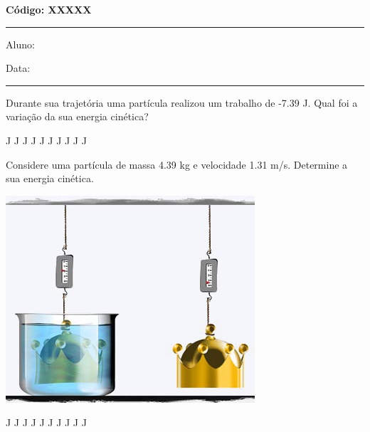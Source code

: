 \documentclass[12pt, addpoints]{exam}
\begin{document}
\begin{minipage}[r]{0.45\linewidth}
    \begin{flushright}
        {\bf \Large Código: XXXXX}
    \end{flushright}
\end{minipage}
\vspace{0.5cm} \hrule \vspace{0.5cm}
\begin{minipage}{0.75\linewidth}
    Aluno:
\end{minipage}
\begin{minipage}{0.20\linewidth}
    Data: 
\end{minipage}
\vspace{0.5cm} \hrule \vspace{0.5cm}

\begin{questions}
\begin{multicols*}{2}
\question[33] Durante sua trajetória uma partícula realizou um trabalho de   -7.39 J. Qual foi a variação da sua energia cinética?

\begin{oneparchoices}
 J J J J J J J J J J\end{oneparchoices}
\question[23] Considere uma partícula de massa    4.39 kg e velocidade    1.31 m/s. Determine a sua energia cinética.

\begin{center}
\begin{minipage}[c]{0.75\linewidth}
\includegraphics[width=\textwidth]{MWE001.jpg}
\end{minipage}

\end{center}
\begin{oneparchoices}
 J J J J J J J J J J\end{oneparchoices}
\end{multicols*}
\end{questions}
\newpage
\end{document}
